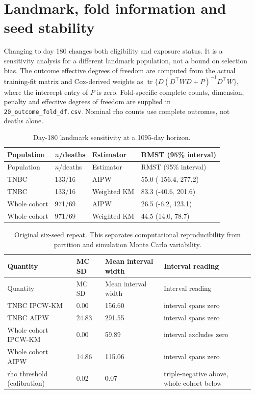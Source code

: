 \documentclass[12pt,letterpaper]{article}
\begin{document}
\section{Landmark, fold information and seed stability}
Changing to day 180 changes both eligibility and exposure status. It is a sensitivity analysis for a different
landmark population, not a bound on selection bias. The outcome effective degrees of freedom are computed
from the actual training-fit matrix and Cox-derived weights as
$\operatorname{tr}\{D(D^\top WD+P)^{-1}D^\top W\}$, where the intercept entry of $P$ is zero.
Fold-specific complete counts, dimension, penalty and effective degrees of freedom are supplied in
\texttt{20\_outcome\_fold\_df.csv}. Nominal rho counts use complete outcomes, not deaths alone.

\begin{longtable}{p{1.2in}p{0.8in}p{1.1in}p{2.7in}}
\caption{Day-180 landmark sensitivity at a 1095-day horizon.}\\
\toprule
Population & $n$/deaths & Estimator & RMST (95\% interval) \\
\midrule\endfirsthead
\toprule
Population & $n$/deaths & Estimator & RMST (95\% interval) \\
\midrule\endhead
\bottomrule\endfoot
TNBC & 133/16 & AIPW & 55.0 (-156.4, 277.2) \\
TNBC & 133/16 & Weighted KM & 83.3 (-40.6, 201.6) \\
Whole cohort & 971/69 & AIPW & 26.5 (-6.2, 123.1) \\
Whole cohort & 971/69 & Weighted KM & 44.5 (14.0, 78.7) \\
\end{longtable}
\begin{longtable}{p{1.85in}p{0.65in}p{1.0in}p{2.2in}}
\caption{Original six-seed repeat. This separates computational reproducibility from partition and simulation Monte Carlo variability.}\\
\toprule
Quantity & MC SD & Mean interval width & Interval reading \\
\midrule\endfirsthead
\toprule
Quantity & MC SD & Mean interval width & Interval reading \\
\midrule\endhead
\bottomrule\endfoot
TNBC IPCW-KM & 0.00 & 156.60 & interval spans zero \\
TNBC AIPW & 24.83 & 291.55 & interval spans zero \\
Whole cohort IPCW-KM & 0.00 & 59.89 & interval excludes zero \\
Whole cohort AIPW & 14.86 & 115.06 & interval spans zero \\
rho threshold (calibration) & 0.02 & 0.07 & triple-negative above, whole cohort below \\
\end{longtable}
\end{document}
